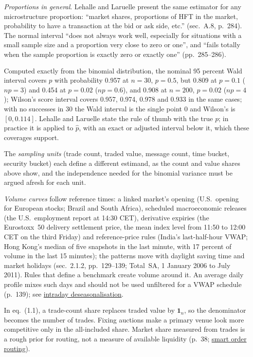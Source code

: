 \begin{qfmethod}
\emph{Proportions in general}. Lehalle and Laruelle present the same estimator for any microstructure proportion: ``market shares, proportions of HFT in the market, probability to have a transaction at the bid or ask side, etc.'' (sec.~A.8, p.~284). The normal interval ``does not always work well, especially for situations with a small sample size and a proportion very close to zero or one'', and ``fails totally when the sample proportion is exactly zero or exactly one'' (pp.~285--286).

Computed exactly from the binomial distribution, the nominal 95 percent Wald interval covers $p$ with probability 0.957 at $n=30$, $p=0.5$, but 0.809 at $p=0.1$ ($np=3$) and 0.454 at $p=0.02$ ($np=0.6$), and 0.908 at $n=200$, $p=0.02$ ($np=4$); Wilson's score interval covers 0.957, 0.974, 0.978 and 0.933 in the same cases; with no successes in 30 the Wald interval is the single point 0 and Wilson's is $[0, 0.114]$. Lehalle and Laruelle state the rule of thumb with the true $p$; in practice it is applied to $\hat p$, with an exact or adjusted interval below it, which these coverages support.

The \emph{sampling units} (trade count, traded value, message count, time bucket, security bucket) each define a different estimand, as the count and value shares above show, and the independence needed for the binomial variance must be argued afresh for each unit.

 \emph{Volume curves} follow reference times: a linked market's opening (U.S.\ opening for European stocks; Brazil and South Africa), scheduled macroeconomic releases (the U.S.\ employment report at 14:30 CET), derivative expiries (the Eurostoxx~50 delivery settlement price, the mean index level from 11:50 to 12:00 CET on the third Friday) and reference-price rules (India's last-half-hour VWAP; Hong Kong's median of five snapshots in the last minute, with 17 percent of volume in the last 15 minutes); the patterns move with daylight saving time and market holidays (sec.~2.1.2, pp.~129--139; Total~SA, 1 January 2006 to July 2011). Rules that define a benchmark create volume around it. An average daily profile mixes such days and should not be used unfiltered for a VWAP schedule (p.~139); see \hyperref[meth:intraday-deseasonalisation]{intraday deseasonalisation}.

 In eq.~(1.1), a trade-count share replaces traded value by $\mathbf 1_n$, so the denominator becomes the number of trades. Fixing auctions make a primary venue look more competitive only in the all-included share. Market share measured from trades is a rough prior for routing, not a measure of available liquidity (p.~38; \hyperref[def:smart-order-routing]{smart order routing}).


\end{qfmethod}
